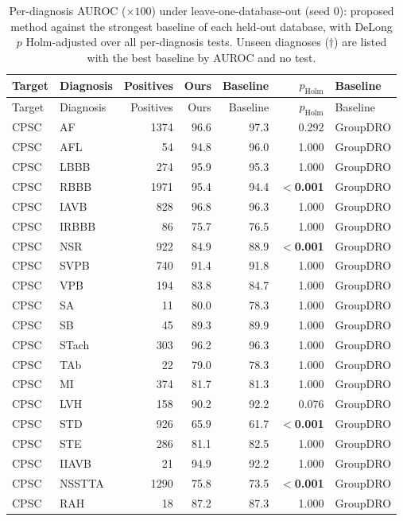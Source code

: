 \begin{longtable}{@{}llrrrrl@{}}
\caption{Per-diagnosis AUROC ($\times100$) under leave-one-database-out (seed 0): proposed method against the strongest baseline of each held-out database, with DeLong $p$ Holm-adjusted over all per-diagnosis tests. Unseen diagnoses ($\dagger$) are listed with the best baseline by AUROC and no test.}\label{tab:perlabel}\\
\toprule Target & Diagnosis & Positives & Ours & Baseline & $p_{\mathrm{Holm}}$ & Baseline \\ \midrule \endfirsthead
\toprule Target & Diagnosis & Positives & Ours & Baseline & $p_{\mathrm{Holm}}$ & Baseline \\ \midrule \endhead
\bottomrule \endfoot
CPSC & AF & 1374 & 96.6 & 97.3 & 0.292 & GroupDRO \\
CPSC & AFL & 54 & 94.8 & 96.0 & 1.000 & GroupDRO \\
CPSC & LBBB & 274 & 95.9 & 95.3 & 1.000 & GroupDRO \\
CPSC & RBBB & 1971 & 95.4 & 94.4 & \textbf{$<$0.001} & GroupDRO \\
CPSC & IAVB & 828 & 96.8 & 96.3 & 1.000 & GroupDRO \\
CPSC & IRBBB & 86 & 75.7 & 76.5 & 1.000 & GroupDRO \\
CPSC & NSR & 922 & 84.9 & 88.9 & \textbf{$<$0.001} & GroupDRO \\
CPSC & SVPB & 740 & 91.4 & 91.8 & 1.000 & GroupDRO \\
CPSC & VPB & 194 & 83.8 & 84.7 & 1.000 & GroupDRO \\
CPSC & SA & 11 & 80.0 & 78.3 & 1.000 & GroupDRO \\
CPSC & SB & 45 & 89.3 & 89.9 & 1.000 & GroupDRO \\
CPSC & STach & 303 & 96.2 & 96.3 & 1.000 & GroupDRO \\
CPSC & TAb & 22 & 79.0 & 78.3 & 1.000 & GroupDRO \\
CPSC & MI & 374 & 81.7 & 81.3 & 1.000 & GroupDRO \\
CPSC & LVH & 158 & 90.2 & 92.2 & 0.076 & GroupDRO \\
CPSC & STD & 926 & 65.9 & 61.7 & \textbf{$<$0.001} & GroupDRO \\
CPSC & STE & 286 & 81.1 & 82.5 & 1.000 & GroupDRO \\
CPSC & IIAVB & 21 & 94.9 & 92.2 & 1.000 & GroupDRO \\
CPSC & NSSTTA & 1290 & 75.8 & 73.5 & \textbf{$<$0.001} & GroupDRO \\
CPSC & RAH & 18 & 87.2 & 87.3 & 1.000 & GroupDRO \\

\end{longtable}
